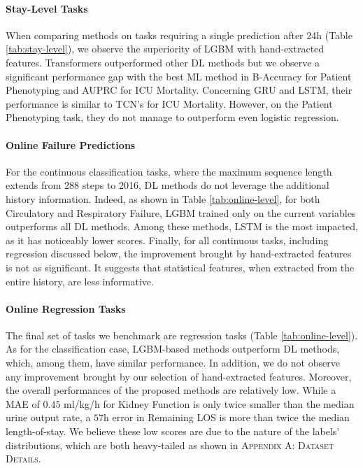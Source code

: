 \documentclass{article}
\begin{document}
\paragraph{Stay-Level Tasks} When comparing methods on tasks requiring a single prediction after 24h (Table \ref{tab:stay-level}), we observe the superiority of LGBM with hand-extracted features. Transformers outperformed other DL methods but we observe a significant performance gap with the best ML method in B-Accuracy for Patient Phenotyping and AUPRC for ICU Mortality. Concerning GRU and LSTM, their performance is similar to TCN's for ICU Mortality. However, on the Patient Phenotyping task, they do not manage to outperform even logistic regression.

\paragraph{Online Failure Predictions} For the continuous classification tasks, where the maximum sequence length extends from 288 steps to 2016, DL methods do not leverage the additional history information. Indeed, as shown in Table \ref{tab:online-level}, for both Circulatory and Respiratory Failure, LGBM trained only on the current variables outperforms all DL methods. Among these methods, LSTM is the most impacted, as it has noticeably lower scores. Finally, for all continuous tasks, including regression discussed below, the improvement brought by hand-extracted features is not as significant. It suggests that statistical features, when extracted from the entire history, are less informative.


\paragraph{Online Regression Tasks} The final set of tasks we benchmark are regression tasks (Table \ref{tab:online-level}). As for the classification case, LGBM-based methods outperform DL methods, which, among them, have similar performance. In addition, we do not observe any improvement brought by our selection of hand-extracted features. Moreover, the overall performances of the proposed methods are relatively low. While a MAE of $0.45$ ml/kg/h for Kidney Function is only twice smaller than the median urine output rate, a $57$h error in Remaining LOS is more than twice the median length-of-stay. We believe these low scores are due to the nature of the labels' distributions, which are both heavy-tailed as shown in \textsc{Appendix A: Dataset Details}.
\end{document}
